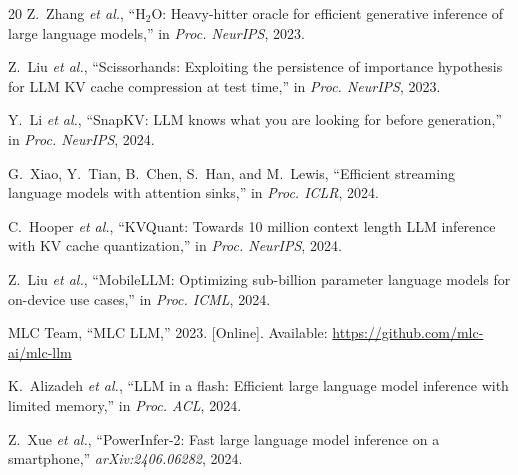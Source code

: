 \documentclass[conference]{IEEEtran}
\begin{document}
\begin{thebibliography}{20}
Z.~Zhang \emph{et al.}, ``H$_2$O: Heavy-hitter oracle for efficient generative inference of large language models,'' in \emph{Proc. NeurIPS}, 2023.

Z.~Liu \emph{et al.}, ``Scissorhands: Exploiting the persistence of importance hypothesis for LLM KV cache compression at test time,'' in \emph{Proc. NeurIPS}, 2023.

Y.~Li \emph{et al.}, ``SnapKV: LLM knows what you are looking for before generation,'' in \emph{Proc. NeurIPS}, 2024.

G.~Xiao, Y.~Tian, B.~Chen, S.~Han, and M.~Lewis, ``Efficient streaming language models with attention sinks,'' in \emph{Proc. ICLR}, 2024.

C.~Hooper \emph{et al.}, ``KVQuant: Towards 10 million context length LLM inference with KV cache quantization,'' in \emph{Proc. NeurIPS}, 2024.

Z.~Liu \emph{et al.}, ``MobileLLM: Optimizing sub-billion parameter language models for on-device use cases,'' in \emph{Proc. ICML}, 2024.

MLC Team, ``MLC LLM,'' 2023. [Online]. Available: \url{https://github.com/mlc-ai/mlc-llm}

K.~Alizadeh \emph{et al.}, ``LLM in a flash: Efficient large language model inference with limited memory,'' in \emph{Proc. ACL}, 2024.

Z.~Xue \emph{et al.}, ``PowerInfer-2: Fast large language model inference on a smartphone,'' \emph{arXiv:2406.06282}, 2024.

\end{thebibliography}
\end{document}
